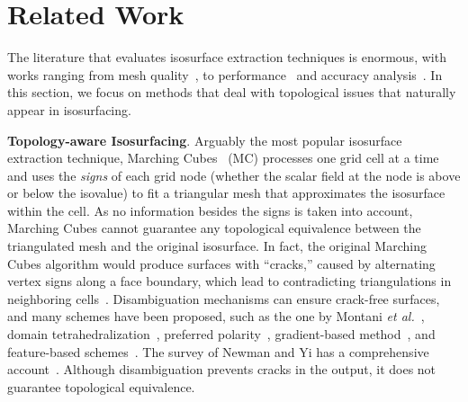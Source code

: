 \section{Related Work}
\label{sec:rw}
 
The literature that evaluates isosurface extraction
techniques is enormous, with works ranging from mesh
quality~\cite{Dietrich:TVCG:2008,Schreiner06,Raman:2008:QIM}, to
performance~\cite{Sutton00acase} and accuracy
analysis~\cite{patera04,zhou01}.
%
In this section, we focus
on methods that deal with
topological issues that naturally appear in isosurfacing. 

\textbf{Topology-aware Isosurfacing}.
Arguably the most popular isosurface extraction technique, Marching Cubes~\cite{lor87}
(MC) processes one grid cell 
at a time and uses the \emph{signs} of each grid node (whether
the scalar field at the node is above or below the isovalue) to fit a triangular mesh that
approximates the isosurface within the cell.
As no information besides the signs is taken into account, Marching
Cubes cannot guarantee any topological 
equivalence between the triangulated mesh and the original isosurface. In fact,
the original Marching
Cubes algorithm would produce surfaces with
``cracks,'' caused by alternating vertex signs along a face boundary,
which lead to contradicting triangulations in neighboring cells~\cite{Nielson:1991:ADR:949607.949621}.
Disambiguation mechanisms can ensure crack-free surfaces,
and many schemes have been proposed, such as
the one by Montani \emph{et al.}~\cite{Montani:1994:MLT},
domain tetrahedralization~\cite{Hamish06}, 
preferred polarity~\cite{Bloomenthal88}, gradient-based method~\cite{gelder:tog:1994}, and
feature-based schemes~\cite{ho:cgf:2005}.
%
The survey of Newman and Yi has a comprehensive account~\cite{newman:candg:2006}.
%
Although disambiguation prevents cracks in the output, it does not
guarantee topological equivalence.

